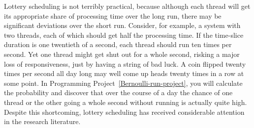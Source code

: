 Lottery scheduling is not
terribly practical, because although each thread will get its
appropriate share of processing time over the long run, there may be
significant deviations over the short run. Consider, for example, a
system with two threads, each of which should get half the processing
time.  If the time-slice duration is one twentieth of a second, each
thread should run ten times per second.  Yet one thread might get shut
out for a whole second, risking a major loss of responsiveness, just
by having a string of bad luck.  A coin flipped twenty times per
second all day long may well come up heads twenty times in a row at
some point.  In Programming Project~\ref{Bernoulli-run-project}, you
will calculate the probability and discover that over the course of a
day the chance of one thread or the other going a whole second
without running is actually quite high.
Despite this shortcoming,
lottery scheduling
has received considerable attention in the research
literature.


